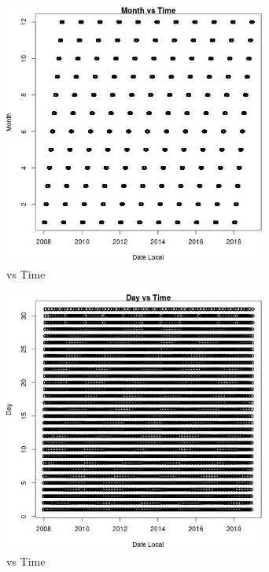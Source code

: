 \begin{figure} 
\centering  
\includegraphics[width=0.77\textwidth]{Code_Outputs/Report_PM25_Step4_part_e_de_duplicated_aves_prioritize_24hr_obs_ML_input_MonthvDate_Local.jpg} 
\caption{\label{fig:Report_PM25_Step4_part_e_de_duplicated_aves_prioritize_24hr_obs_ML_inputMonthvDate_Local}vs Time} 
\end{figure} 
 

\begin{figure} 
\centering  
\includegraphics[width=0.77\textwidth]{Code_Outputs/Report_PM25_Step4_part_e_de_duplicated_aves_prioritize_24hr_obs_ML_input_DayvDate_Local.jpg} 
\caption{\label{fig:Report_PM25_Step4_part_e_de_duplicated_aves_prioritize_24hr_obs_ML_inputDayvDate_Local}vs Time} 
\end{figure} 
 

